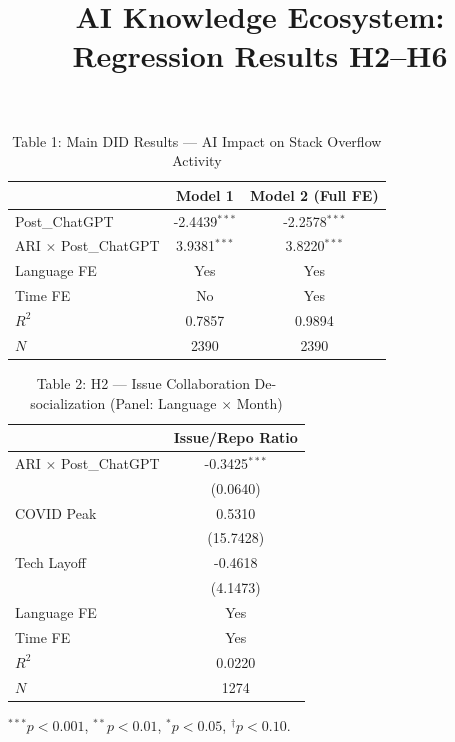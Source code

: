\documentclass[12pt]{article}
\begin{document}
\title{AI Knowledge Ecosystem: Regression Results H2--H6}
\date{}\maketitle

\begin{table}[htbp]
\centering
\caption{Table 1: Main DID Results --- AI Impact on Stack Overflow Activity}
\begin{tabular}{lcc}
\toprule
 & Model 1 & Model 2 (Full FE) \\
\midrule
Post\_ChatGPT & -2.4439$^{***}$ & -2.2578$^{***}$ \\
ARI $\times$ Post\_ChatGPT & 3.9381$^{***}$ & 3.8220$^{***}$ \\
\midrule
Language FE & Yes & Yes \\
Time FE & No & Yes \\
$R^2$ & 0.7857 & 0.9894 \\
$N$ & 2390 & 2390 \\
\bottomrule
\end{tabular}
\end{table}

\begin{table}[htbp]
\centering
\caption{Table 2: H2 --- Issue Collaboration De-socialization (Panel: Language $\times$ Month)}
\begin{tabular}{lc}
\toprule
 & Issue/Repo Ratio \\
\midrule
ARI $\times$ Post\_ChatGPT & -0.3425$^{***}$ \\
 & (0.0640) \\
COVID Peak & 0.5310 \\
 & (15.7428) \\
Tech Layoff & -0.4618 \\
 & (4.1473) \\
\midrule
Language FE & Yes \\
Time FE & Yes \\
$R^2$ & 0.0220 \\
$N$ & 1274 \\
\bottomrule
\end{tabular}
\par\smallskip
{\footnotesize $^{***}p<0.001$, $^{**}p<0.01$, $^{*}p<0.05$, $^\dagger p<0.10$.}
\end{table}
\end{document}

